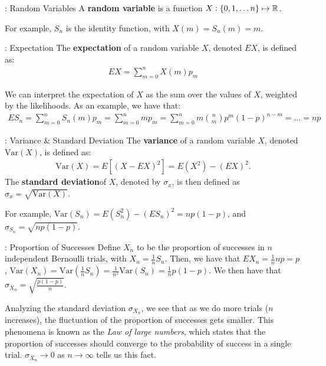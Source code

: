 \begin{ndef}{: Random Variables}{}
    A \textbf{random variable} is a function $X: \set{0, 1, \ldots n} \mapsto \mathbb{R}$. 
\end{ndef}
\noindent For example, $S_n$ is the identity function, with $X(m) = S_n(m) = m$. 

\begin{ndef}{: Expectation}{}
    The \textbf{expectation} of a random variable $X$, denoted $EX$, is defined as:
    \begin{align*}
        EX = \sum_{m=0}^n X(m)p_m
    \end{align*}
\end{ndef}
\noindent We can interpret the expectation of $X$ as the sum over the values of $X$, weighted by the likelihoods. As an example, we have that:
\begin{align*}
    ES_n = \sum_{m=0}^n S_n(m)p_m = \sum_{m=0}^n mp_m = \sum_{m=0}^n m\binom{n}{m}p^m(1-p)^{n-m} = \ldots = np
\end{align*}

\begin{ndef}{: Variance \& Standard Deviation}{}
    The \textbf{variance} of a random variable $X$, denoted $\text{Var}(X)$, is defined as:
    \begin{align*}
        \text{Var}(X) = E[(X - EX)^2] = E(X^2) - (EX)^2.
    \end{align*}
    The \textbf{standard deviation}of $X$, denoted by $\sigma_x$, is then defined as $\sigma_x = \sqrt{\text{Var}(X)}$.
\end{ndef}
\noindent For example, $\text{Var}(S_n) = E(S_n^2) - (ES_n)^2 = np(1-p)$, and $\sigma_{S_n} = \sqrt{np(1-p)}$. 

\begin{ndef}{: Proportion of Successes}{}
    Define $X_n$ to be the proportion of successes in $n$ independent Bernoulli trials, with $X_n = \frac{1}{n}S_n$. Then, we have that $EX_n = \frac{1}{n}np = p$, $\text{Var}(X_n) = \text{Var}(\frac{1}{n}S_n) = \frac{1}{n^2}\text{Var}(S_n)= \frac{1}{n}p(1-p)$. We then have that $\sigma_{X_n} = \sqrt{\frac{p(1-p)}{n}}$.
\end{ndef}
\noindent Analyzing the standard deviation $\sigma_{X_n}$, we see that as we do more trials ($n$ increases), the fluctuation of the proportion of successes gets smaller. This phenomena is known as the \emph{Law of large numbers}, which states that the proportion of successes should converge to the probability of success in a single trial. $\sigma_{X_n} \rightarrow 0$ as $n \rightarrow \infty$ tells us this fact. 

